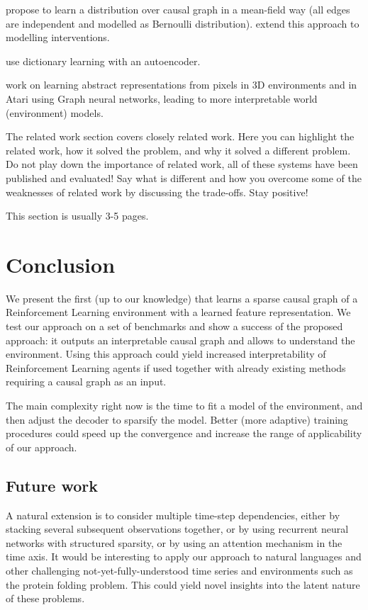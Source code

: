 \documentclass[a4paper,11pt,oneside]{report}
\begin{document}
\cite{kalainathan2018structural, ng2019masked} propose to learn a distribution over causal graph in a mean-field way (all edges are independent and modelled as Bernoulli distribution). \cite{Brouillard2020} extend this approach to modelling interventions.

\cite{Fallah2020} use dictionary learning with an autoencoder.

\cite{kipf2019contrastive} work on learning abstract representations from pixels in 3D environments and in Atari using Graph neural networks, leading to more interpretable world (environment) models.

The related work section covers closely related work. Here you can highlight
the related work, how it solved the problem, and why it solved a different
problem. Do not play down the importance of related work, all of these
systems have been published and evaluated! Say what is different and how
you overcome some of the weaknesses of related work by discussing the
trade-offs. Stay positive!

This section is usually 3-5 pages.


\chapter{Conclusion}
\label{ch:conclusion}

We present the first (up to our knowledge) that learns a sparse causal graph of a Reinforcement Learning environment with a learned feature representation. We test our approach on a set of benchmarks and show a success of the proposed approach: it outputs an interpretable causal graph and allows to understand the environment. Using this approach could yield increased interpretability of Reinforcement Learning agents if used together with already existing methods requiring a causal graph as an input.

The main complexity right now is the time to fit a model of the environment, and then adjust the decoder to sparsify the model. Better (more adaptive) training procedures could speed up the convergence and increase the range of applicability of our approach.

\section{Future work}
A natural extension is to consider multiple time-step dependencies, either by stacking several subsequent observations together, or by using recurrent neural networks with structured sparsity, or by using an attention mechanism in the time axis. It would be interesting to apply our approach to natural languages and other challenging not-yet-fully-understood time series and environments such as the protein folding problem. This could yield novel insights into the latent nature of these problems.
\end{document}
